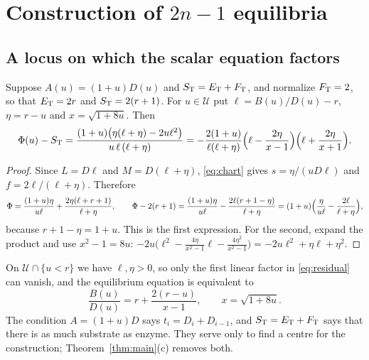 \section{Construction of \texorpdfstring{\(2n-1\)}{2n-1} equilibria}\label{sec:construction}

\subsection{A locus on which the scalar equation factors}
\begin{lemma}\label{lem:factor}
Suppose \(A(u)=(1+u)D(u)\) and \(S_{\mathrm T}=E_{\mathrm T}+F_{\mathrm T}\), and normalize \(F_{\mathrm T}=2\), so that \(E_{\mathrm T}=2r\) and
\(S_{\mathrm T}=2(r+1)\). For \(u\in\mathcal U\) put \(\ell=B(u)/D(u)-r\), \(\eta=r-u\) and
\(x=\sqrt{1+8u}\). Then
\begin{equation}\label{eq:residual}
 \Phi(u)-S_{\mathrm T}=\frac{(1+u)\bigl(\eta(\ell+\eta)-2u\ell^2\bigr)}{u\,\ell\,(\ell+\eta)}
 =-\frac{2(1+u)}{\ell(\ell+\eta)}\Bigl(\ell-\frac{2\eta}{x-1}\Bigr)\Bigl(\ell+\frac{2\eta}{x+1}\Bigr).
\end{equation}
\end{lemma}
\begin{proof}
Since \(L=D\ell\) and \(M=D(\ell+\eta)\), \eqref{eq:chart} gives \(s=\eta/(uD\ell)\) and
\(f=2\ell/(\ell+\eta)\). Therefore
\[
 \Phi=\frac{(1+u)\eta}{u\ell}+\frac{2\eta(\ell+r+1)}{\ell+\eta},\qquad
 \Phi-2(r+1)=\frac{(1+u)\eta}{u\ell}-\frac{2\ell(r+1-\eta)}{\ell+\eta}
 =(1+u)\Bigl(\frac{\eta}{u\ell}-\frac{2\ell}{\ell+\eta}\Bigr),
\]
because \(r+1-\eta=1+u\). This is the first expression. For the second, expand the product and
use \(x^2-1=8u\):
\(-2u\bigl(\ell^2-\tfrac{4\eta}{x^2-1}\ell-\tfrac{4\eta^2}{x^2-1}\bigr)=-2u\ell^2+\eta\ell+\eta^2\).
\end{proof}

On \(\mathcal U\cap\{u<r\}\) we have \(\ell,\eta>0\), so only the first linear factor in
\eqref{eq:residual} can vanish, and the equilibrium equation is equivalent to
\begin{equation}\label{eq:interp}
 \frac{B(u)}{D(u)}=r+\frac{2(r-u)}{x-1},\qquad x=\sqrt{1+8u}.
\end{equation}
The condition \(A=(1+u)D\) says \(t_i=D_i+D_{i-1}\), and \(S_{\mathrm T}=E_{\mathrm T}+F_{\mathrm T}\) says that there is as
much substrate as enzyme. They serve only to find a centre for the construction;
Theorem~\ref{thm:main}(c) removes both.

